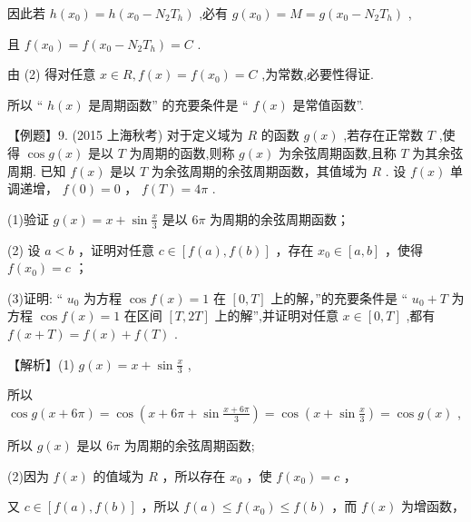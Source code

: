 \documentclass[10pt]{article}
\begin{document}
因此若 \(h\left( {x}_{0}\right)  = h\left( {{x}_{0} - {N}_{2}{T}_{h}}\right)\) ,必有 \(g\left( {x}_{0}\right)  = M = g\left( {{x}_{0} - {N}_{2}{T}_{h}}\right)\) ,

且 \(f\left( {x}_{0}\right)  = f\left( {{x}_{0} - {N}_{2}{T}_{h}}\right)  = C\) .

由 (2) 得对任意 \(x \in  R,f\left( x\right)  = f\left( {x}_{0}\right)  = C\) ,为常数,必要性得证.

所以 “ \(h\left( x\right)\) 是周期函数” 的充要条件是 “ \(f\left( x\right)\) 是常值函数”.

【例题】9. (2015 上海秋考) 对于定义域为 \(R\) 的函数 \(g\left( x\right)\) ,若存在正常数 \(T\) ,使得 \(\cos g\left( x\right)\) 是以 \(T\) 为周期的函数,则称 \(g\left( x\right)\) 为余弦周期函数,且称 \(T\) 为其余弦周期. 已知 \(f\left( x\right)\) 是以 \(T\) 为余弦周期的余弦周期函数，其值域为 \(R\) . 设 \(f\left( x\right)\) 单调递增， \(f\left( 0\right)  = 0\) ， \(f\left( T\right)  = {4\pi }\) .

(1)验证 \(g\left( x\right)  = x + \sin \frac{x}{3}\) 是以 \({6\pi }\) 为周期的余弦周期函数；

(2) 设 \(a < b\) ，证明对任意 \(c \in  \left\lbrack  {f\left( a\right) ,f\left( b\right) }\right\rbrack\) ，存在 \({x}_{0} \in  \left\lbrack  {a,b}\right\rbrack\) ，使得 \(f\left( {x}_{0}\right)  = c\) ；

(3)证明: “ \({u}_{0}\) 为方程 \(\cos f\left( x\right)  = 1\) 在 \(\left\lbrack  {0,T}\right\rbrack\) 上的解，”的充要条件是 “ \({u}_{0} + T\) 为方程 \(\cos f\left( x\right)  = 1\) 在区间 \(\left\lbrack  {T,{2T}}\right\rbrack\) 上的解”,并证明对任意 \(x \in  \left\lbrack  {0,T}\right\rbrack\) ,都有 \(f\left( {x + T}\right)  = f\left( x\right)  + f\left( T\right)\) .

【解析】(1) \(g\left( x\right)  = x + \sin \frac{x}{3}\) ,

所以 \(\cos g\left( {x + {6\pi }}\right)  = \cos \left( {x + {6\pi } + \sin \frac{x + {6\pi }}{3}}\right)  = \cos \left( {x + \sin \frac{x}{3}}\right)  = \cos g\left( x\right)\) ,

所以 \(g\left( x\right)\) 是以 \({6\pi }\) 为周期的余弦周期函数;

(2)因为 \(f\left( x\right)\) 的值域为 \(R\) ，所以存在 \({x}_{0}\) ，使 \(f\left( {x}_{0}\right)  = c\) ，

又 \(c \in  \left\lbrack  {f\left( a\right) ,f\left( b\right) }\right\rbrack\) ，所以 \(f\left( a\right)  \leq  f\left( {x}_{0}\right)  \leq  f\left( b\right)\) ，而 \(f\left( x\right)\) 为增函数，
\end{document}
